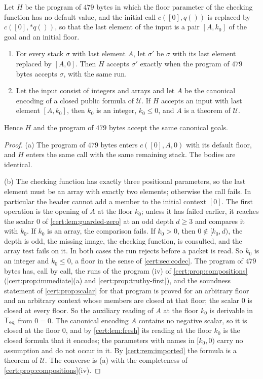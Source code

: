 \begin{proposition}\label{cert:prop:header}
Let $H$ be the program of $479$ bytes in which the floor parameter of the
checking function has no default value, and the initial call
$c([0],q())$ is replaced by $c([0],{*}q())$, so that the last element of the
input is a pair $[A,k_0]$ of the goal and an initial floor.
\begin{enumerate}[label=(\alph*)]
\item For every stack $\sigma$ with last element $A$, let $\sigma'$ be $\sigma$
with its last element replaced by $[A,0]$. Then $H$ accepts $\sigma'$ exactly
when the program of $479$ bytes accepts $\sigma$, with the same run.
\item Let the input consist of integers and arrays and let $A$ be the canonical
encoding of a closed public formula of $\mathcal U$. If $H$ accepts an input
with last element $[A,k_0]$, then $k_0$ is an integer, $k_0\le 0$, and $A$ is a
theorem of $\mathcal U$.
\end{enumerate}
Hence $H$ and the program of $479$ bytes accept the same canonical goals.
\end{proposition}
\begin{proof}
(a) The program of $479$ bytes enters $c([0],A,0)$ with its default floor, and
$H$ enters the same call with the same remaining stack. The bodies are
identical.

(b) The checking function has exactly three positional parameters, so the
last element must be an array with exactly two elements; otherwise the call
fails. In particular the header cannot add a member to the initial context
$[0]$. The first operation is the opening of $A$ at the floor $k_0$; unless it
has failed earlier, it reaches the scalar $0$ of \cref{cert:lem:guarded-zero}
at an odd depth $d\ge 3$ and compares it with $k_0$. If $k_0$ is an array, the
comparison fails. If $k_0>0$, then $0\notin[k_0,d)$, the depth is odd, the
missing image, the checking function, is consulted, and the array test fails
on it. In both cases the run rejects before a packet is read. So $k_0$ is an
integer and $k_0\le 0$, a floor in the sense of \cref{cert:sec:codec}. The
program of $479$ bytes has, call by call, the runs of the program (iv) of
\cref{cert:prop:compositions} (\cref{cert:prop:immediate}(a) and
\cref{cert:prop:truthy-first}), and the soundness statement of
\cref{cert:prop:scalar} for that program is proved for an arbitrary floor and
an arbitrary context whose members are closed at that floor; the scalar $0$
is closed at every floor. So the auxiliary
reading of $A$ at the floor $k_0$ is derivable in $\mathsf{T}_{\mathrm{eq}}$ from $0=0$. The
canonical encoding $A$ contains no negative scalar, so it is closed at the
floor $0$, and by \cref{cert:lem:fresh} its reading at the floor $k_0$ is the
closed formula that it encodes; the parameters with names in $[k_0,0)$ carry no
assumption and do not occur in it. By \cref{cert:rem:imported} the formula is
a theorem of $\mathcal U$. The converse is (a) with the completeness of
\cref{cert:prop:compositions}(iv).
\end{proof}

